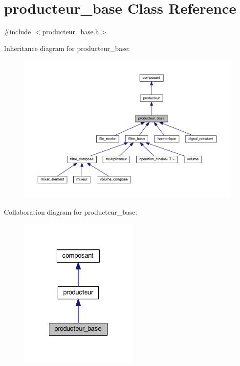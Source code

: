 \hypertarget{classproducteur__base}{\section{producteur\-\_\-base Class Reference}
\label{classproducteur__base}
}


{\ttfamily \#include $<$producteur\-\_\-base.\-h$>$}



Inheritance diagram for producteur\-\_\-base\-:
\nopagebreak
\begin{figure}[H]
\begin{center}
\leavevmode
\includegraphics[width=350pt]{classproducteur__base__inherit__graph}
\end{center}
\end{figure}


Collaboration diagram for producteur\-\_\-base\-:
\nopagebreak
\begin{figure}[H]
\begin{center}
\leavevmode
\includegraphics[width=168pt]{classproducteur__base__coll__graph}
\end{center}
\end{figure}

